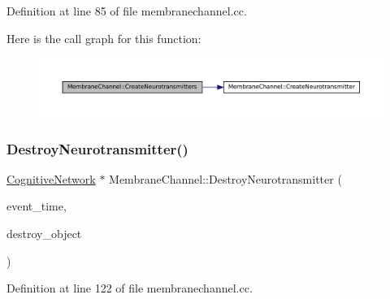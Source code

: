 Definition at line 85 of file membranechannel.\+cc.

Here is the call graph for this function\+:\nopagebreak
\begin{figure}[H]
\begin{center}
\leavevmode
\includegraphics[width=350pt]{class_membrane_channel_a24c791e6cfd906d49e0ceb8a24eeb4cb_cgraph}
\end{center}
\end{figure}
\mbox{\label{class_membrane_channel_a985d8f93077b0f93daa9c311a22917a1}} 
\subsubsection{\texorpdfstring{Destroy\+Neurotransmitter()}{DestroyNeurotransmitter()}}
{\footnotesize\ttfamily \mbox{\hyperlink{class_cognitive_network}{Cognitive\+Network}} $\ast$ Membrane\+Channel\+::\+Destroy\+Neurotransmitter (\begin{DoxyParamCaption}\item[{std\+::chrono\+::time\+\_\+point$<$ \mbox{\hyperlink{universe_8h_a0ef8d951d1ca5ab3cfaf7ab4c7a6fd80}{Clock}} $>$}]{event\+\_\+time,  }\item[{\mbox{\hyperlink{class_cognitive_network}{Cognitive\+Network}} $\ast$}]{destroy\+\_\+object }\end{DoxyParamCaption})}



Definition at line 122 of file membranechannel.\+cc.

\mbox{\label{class_membrane_channel_ad5dfc13b89aff0c7383e052113da1d8f}} 
